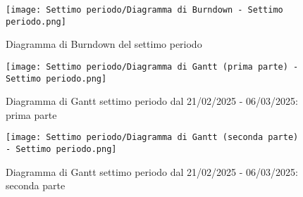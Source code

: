 \newpage
\begin{figure}[h] 
    \centering
    \texttt{[image: Settimo periodo/Diagramma di Burndown - Settimo periodo.png]}
    \caption{Diagramma di Burndown del settimo periodo} 
    \label{fig: Diagramma di Burndown del settimo periodo}
\end{figure}
\newpage
\begin{figure}[h] 
    \centering
    \texttt{[image: Settimo periodo/Diagramma di Gantt (prima parte) - Settimo periodo.png]}
    \caption{Diagramma di Gantt settimo periodo dal 21/02/2025 - 06/03/2025: prima parte} 
    \label{fig: Diagramma di Gantt settimo periodo dal 21/02/2025 - 06/03/2025: prima parte}
\end{figure}
\newpage
\begin{figure}[h] 
    \centering
    \texttt{[image: Settimo periodo/Diagramma di Gantt (seconda parte) - Settimo periodo.png]}
    \caption{Diagramma di Gantt settimo periodo dal 21/02/2025 - 06/03/2025: seconda parte} 
    \label{fig: Diagramma di Gantt settimo periodo dal 21/02/2025 - 06/03/2025: seconda parte}
\end{figure}

\newpage
